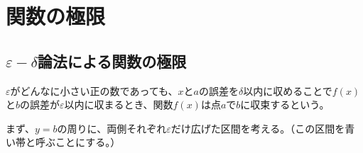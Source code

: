\documentclass[../../imaging-math]{subfiles}
\begin{document}
\section{関数の極限}

\subsection{$\varepsilon - \delta$論法による関数の極限}

$\varepsilon$がどんなに小さい正の数であっても、$x$と$a$の誤差を$\delta$以内に収めることで$f(x)$と$b$の誤差が$\varepsilon$以内に収まるとき、関数$f(x)$は点$a$で$b$に収束するという。

\froufrou

まず、$y=b$の周りに、両側それぞれ$\varepsilon$だけ広げた区間を考える。（この区間を青い帯と呼ぶことにする。）
\end{document}
